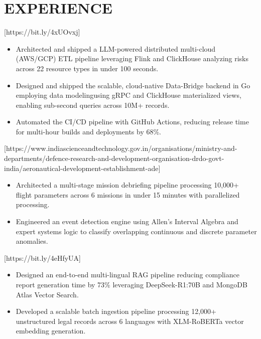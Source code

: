 \section*{EXPERIENCE}

[https://bit.ly/4xUOvxj]
\begin{itemize}
  \item Architected and shipped a LLM-powered distributed multi-cloud (AWS/GCP) ETL pipeline leveraging Flink and ClickHouse analyzing risks across 22 resource types in under 100 seconds. 
  \item Designed and shipped the scalable, cloud-native Data-Bridge backend in Go employing data modelingusing gRPC and ClickHouse materialized views, enabling sub-second queries across 10M+ records.
  \item Automated the CI/CD pipeline with GitHub Actions, reducing release time for multi-hour builds and deployments by 68\%.
\end{itemize}

[https://www.indiascienceandtechnology.gov.in/organisations/ministry-and-departments/defence-research-and-development-organisation-drdo-govt-india/aeronautical-development-establishment-ade]
\begin{itemize}
  \item Architected a multi-stage mission debriefing pipeline processing 10,000+ flight parameters across 6 missions in under 15 minutes with parallelized processing.
  \item Engineered an event detection engine using Allen's Interval Algebra and expert systems logic to classify overlapping continuous and discrete parameter anomalies.
\end{itemize}

[https://bit.ly/4eHfyUA]
\begin{itemize}
  \item Designed an end-to-end multi-lingual RAG pipeline reducing compliance report generation time by 73\% leveraging DeepSeek-R1:70B and MongoDB Atlas Vector Search.
  \item Developed a scalable batch ingestion pipeline processing 12,000+ unstructured legal records across 6 languages with XLM-RoBERTa vector embedding generation. 
\end{itemize}

